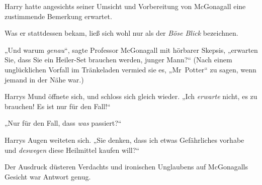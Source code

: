 Harry hatte angesichts seiner Umsicht und Vorbereitung von McGonagall eine zustimmende Bemerkung erwartet.

Was er stattdessen bekam, ließ sich wohl nur als der \emph{Böse Blick} bezeichnen.

„Und warum \emph{genau}“, sagte Professor McGonagall mit hörbarer Skepsis, „erwarten Sie, dass Sie ein Heiler-Set brauchen werden, junger Mann?“ (Nach einem unglücklichen Vorfall im Tränkeladen vermied sie es,
„Mr~Potter“ zu sagen, wenn jemand in der Nähe war.)

Harrys Mund öffnete sich, und schloss sich gleich wieder.
„Ich \emph{erwarte} nicht, es zu brauchen! Es ist nur für den Fall!“

„Nur für den Fall, dass \emph{was} passiert?“

Harrys Augen weiteten sich.
„Sie denken, dass ich etwas Gefährliches vorhabe und \emph{deswegen} diese Heilmittel kaufen will?“

Der Ausdruck düsteren Verdachts und ironischen Unglaubens auf McGonagalls Gesicht war Antwort genug.

